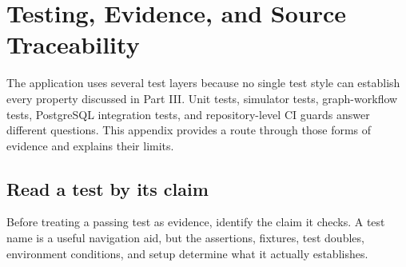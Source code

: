 \chapter{Testing, Evidence, and Source Traceability}
\label{app:testing}

The application uses several test layers because no single test style can establish every property discussed in Part III. Unit tests, simulator tests, graph-workflow tests, PostgreSQL integration tests, and repository-level CI guards answer different questions. This appendix provides a route through those forms of evidence and explains their limits.

\section{Read a test by its claim}

Before treating a passing test as evidence, identify the claim it checks. A test name is a useful navigation aid, but the assertions, fixtures, test doubles, environment conditions, and setup determine what it actually establishes.

